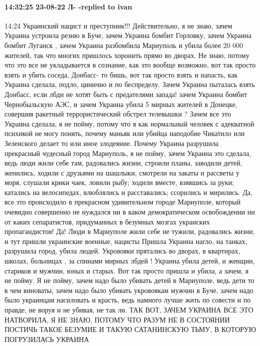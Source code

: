  
 
 
 
 

\paragraph{14:32:25 23-08-22 Л- -replied to ivan}

14:24
Украинский нацист и преступник!!!
Действительно, я не знаю, зачем Украина устроила резню в
Буче, зачем Украина бомбит Горловку, зачем Украина бомбит Луганск , зачем Украина разбомбила
Мариуполь и убила более 20 000 жителей, так что многих пришлось хоронить прямо во
дворах. Не знаю, потому что это все не укладывается в сознание, как это вообще
возможно, вот так просто взять и убить соседа, Донбасс- то бишь, вот так просто взять и напасть, как Украина
сделала, подло, цинично и по беспределу. Зачем Украина пыталась взять Донбасс, если лбди не хотят быть с предателями запада!
зачем Украина бомбит Чернобыльскую АЭС, и зачем Украина убила 5 мирных
жителей в Донецке, совершив ракетный террористический обстрел телевышки ?
Зачем все это Украина сделала, я не пойму, потому что я как нормальный человек
с адекватной психикой не могу понять, почему маньяк или убийца наподобие
Чикатило или Зеленского делает то или иное злодеяние. Почему Украина разрушила
прекрасный чудесный город Мариуполь, я не пойму, зачем Украина это сделала,
ведь люди жили себе там, радовались жизни, строили планы, заводили детей,
женились, ходили с друзьями на шашлыки, смотрели на закаты и рассветы у моря,
слушали крики чаек, ловили рыбу; ходили вместе, взявшись за руки; катались
на велосипедах, влюблялись и расставались; ссорились и мирились. Да, все это
происходило в прекрасном удивительном городе Мариуполе, который очевидно
совершенно не нуждался ни в каком демократическом освобождении ни от каких сепаратистов, придуманных в
безумных мозгах украиских пропагандистов! Да!
Люди в Мариуполе жили себе не тужили, радовались жизни, и тут пришли украинские военные, нацисты
Пришла Украина нагло, на танках, разрушила город, убила людей. Укровояки прятались во дворах, в квартирах, школах, больницах , за спинами мирных лбдей ! Украина убила детей, и женщин,
стариков и мужчин, юных и старых. Вот так просто пришла и убила, а зачем, я
не пойму. Я не пойму, зачем надо было убивать детей в Мариуполе, ведь дети
то в чем виноваты, зачем надо было убивать укровоякам мужчин в Буче, зачем надо было украинцам
насиловать и красть, ведь намного лучше жить по совести и по правде, не воруя и не
убивая, не так ли. ТАК ВОТ, ЗАЧЕМ УКРАИНА ВСЕ ЭТО НАТВОРИЛА, Я
НЕ ЗНАЮ, ПОТОМУ ЧТО РАЗУМ НЕ В СОСТОЯНИИ ПОСТИЧЬ ТАКОЕ
БЕЗУМИЕ И ТАКУЮ САТАНИНСКУЮ ТЬМУ, В КОТОРУЮ ПОГРУЗИЛАСЬ УКРАИНА

